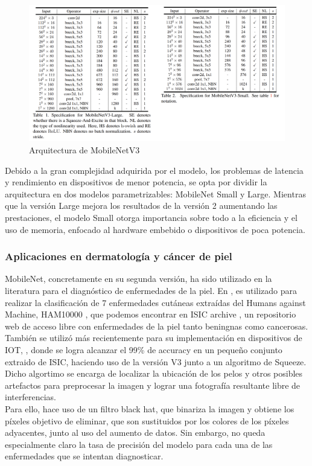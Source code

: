     \begin{figure}[H]
	\label{mv2}
	\centering
	\includegraphics[scale = 0.85]{imagenes/mobilev3.png}
	\caption{Arquitectura de MobileNetV3}
\end{figure}

Debido a la gran complejidad adquirida por el modelo, los problemas de latencia y rendimiento en dispositivos de menor potencia, se opta por dividir la arquitectura en dos modelos parametrizables: MobileNet Small y Large. Mientras que la versión Large mejora los resultados de la versión 2 aumentando las prestaciones, el modelo Small otorga importancia sobre todo a la eficiencia y el uso de memoria, enfocado al hardware embebido o dispositivos de poca potencia.


\subsubsection{Aplicaciones en dermatología y cáncer de piel}

MobileNet, concretamente en su segunda versión, ha sido utilizado en la literatura para el diagnóstico de enfermedades de la piel. En \cite{Chaturvedi_2020}, es utilizado para realizar la clasificación de 7 enfermedades cutáneas extraídas del Humans against Machine, HAM10000 \cite{ham10000}, que podemos encontrar en ISIC archive \cite{isicarchive}, un repositorio web de acceso libre con enfermedades de la piel tanto beningnas como cancerosas. \\

También se utilizó más recientemente para su implementación en dispositivos de IOT, \cite{mnetsqueeze}, donde se logra alcanzar el 99\% de accuracy en un pequeño conjunto extraido de ISIC, haciendo uso de la versión V3 junto a un algoritmo de Squeeze. Dicho algortimo se encarga de localizar la ubicación de los pelos y otros posibles artefactos para preprocesar la imagen y lograr una fotografía resultante libre de interferencias. \\
Para ello, hace uso de un filtro black hat, que binariza la imagen y obtiene los píxeles objetivo de eliminar, que son sustituidos por los colores de los píxeles adyacentes, junto al uso del aumento de datos. Sin embargo, no queda especialmente claro la tasa de precisión del modelo para cada una de las enfermedades que se intentan diagnosticar.
